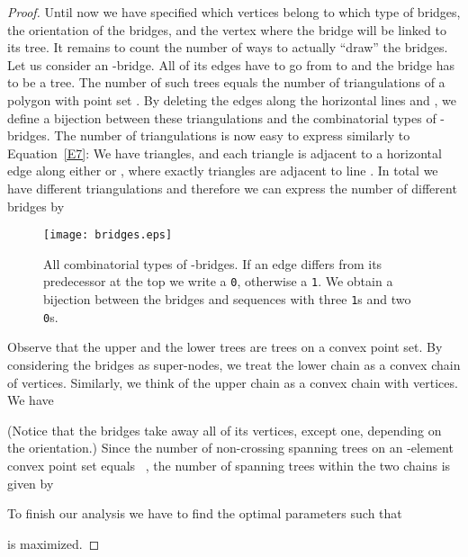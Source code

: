 \documentclass[11pt]{article}
\begin{document}
\begin{proof}
Until now we have specified which vertices belong to which type of
bridges, the orientation of the bridges, and the vertex where the
bridge will be linked to its tree. It remains to count the number of
ways to actually ``draw'' the bridges. Let us consider an
-bridge. All of its edges have to go from  to  and the bridge
has to be a tree. The number of such trees equals the number of
triangulations of a polygon with point set . By deleting the
edges along the horizontal lines  and , we define a bijection
between these triangulations and the combinatorial types of -bridges.
The number of triangulations is now easy to express similarly to Equation~\eqref{E7}:
We have  triangles, and each triangle is adjacent to a horizontal edge
along either  or , where exactly  triangles are adjacent to line .
In total we have  different
triangulations and therefore
we can express the number of different bridges by


\begin{figure}[htbp]
\centerline{ \texttt{[image: bridges.eps]}}
\caption{All  combinatorial types of
  -bridges. If an edge differs from its predecessor at the top
  we write a
{\tt 0}, otherwise a {\tt 1}. We obtain a bijection between the
bridges and sequences with three {\tt 1}s and two {\tt 0}s.}
\label{fig:bridges}
\end{figure}

Observe that the upper and the lower trees are trees on a convex point set.
By considering the bridges as super-nodes, we treat the lower chain as
a convex chain of  vertices. Similarly, we think of the upper chain as
a convex chain with  vertices.
We have

 (Notice that the bridges take away all of its vertices, except one,
depending on the orientation.) Since the number of non-crossing
spanning trees on an -element convex point set equals
~\cite{FN99}, the number of
spanning trees within the two chains is given by

To finish our analysis we have to find the optimal parameters
 such that

is maximized.


\end{proof}
\end{document}
